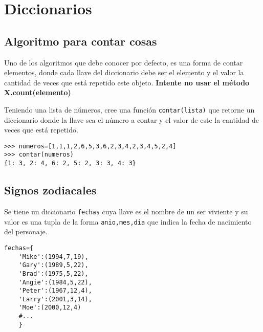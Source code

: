 \section{Diccionarios}




\subsection{Algoritmo para contar cosas}

Uno de los algoritmos que debe conocer por defecto, es una forma de contar elementos, donde cada llave del diccionario debe ser el elemento y el valor la cantidad de veces que está repetido este objeto. \textbf{Intente no usar el método X.count(elemento)}

Teniendo una lista de números, cree una función \texttt{contar(lista)} que retorne un diccionario donde la llave sea el número a contar y el valor de este la cantidad de veces que está repetido.

\begin{lstlisting}[style=consola]
>>> numeros=[1,1,1,2,6,5,3,6,2,3,4,2,3,4,5,2,4]
>>> contar(numeros)
{1: 3, 2: 4, 6: 2, 5: 2, 3: 3, 4: 3}
\end{lstlisting}

\subsection{Signos zodiacales}

Se tiene un diccionario \texttt{fechas} cuya llave es el nombre de un ser viviente y su valor es una tupla de la forma \texttt{anio,mes,dia} que indica la fecha de nacimiento del personaje.

\begin{lstlisting}[style=consola]
fechas={
    'Mike':(1994,7,19),
    'Gary':(1989,5,22),
    'Brad':(1975,5,22),
    'Angie':(1984,5,22),
    'Peter':(1967,12,4),
    'Larry':(2001,3,14),
    'Moe':(2000,12,4)
    #...
    }
\end{lstlisting}

